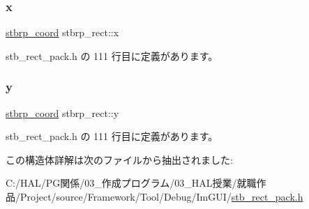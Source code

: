 \mbox{\label{structstbrp__rect_a4cc623a3e29f0bc0d3375f6645c84d18}} 
\subsubsection{\texorpdfstring{x}{x}}
{\footnotesize\ttfamily \mbox{\hyperlink{stb__rect__pack_8h_ac2c2491b95dea6a298b7423dc762dfd9}{stbrp\+\_\+coord}} stbrp\+\_\+rect\+::x}



 stb\+\_\+rect\+\_\+pack.\+h の 111 行目に定義があります。

\mbox{\label{structstbrp__rect_ae3034c1fbf86043b568f5a4dddf946fa}} 
\subsubsection{\texorpdfstring{y}{y}}
{\footnotesize\ttfamily \mbox{\hyperlink{stb__rect__pack_8h_ac2c2491b95dea6a298b7423dc762dfd9}{stbrp\+\_\+coord}} stbrp\+\_\+rect\+::y}



 stb\+\_\+rect\+\_\+pack.\+h の 111 行目に定義があります。



この構造体詳解は次のファイルから抽出されました\+:\begin{DoxyCompactItemize}
\item 
C\+:/\+H\+A\+L/\+P\+G関係/03\+\_\+作成プログラム/03\+\_\+\+H\+A\+L授業/就職作品/\+Project/source/\+Framework/\+Tool/\+Debug/\+Im\+G\+U\+I/\mbox{\hyperlink{stb__rect__pack_8h}{stb\+\_\+rect\+\_\+pack.\+h}}\end{DoxyCompactItemize}
